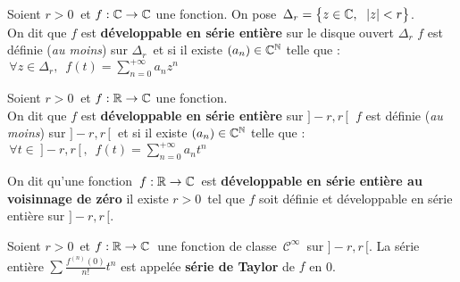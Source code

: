 \vspace{1.4cm}

Soient \(r>0\ \) et \(f:\mathbb{C} \to \mathbb{C}\) une fonction. On pose \(\,\Delta_r=\bigl\{ z\in \mathbb{C}, \ \; |z|<r \bigr\}\).\vspace{0.1cm}\\
On dit que \(f\) est \textbf{développable en série entière} sur le disque ouvert \(\Delta_r\) \ssi \(f\) est\vspace{0.1cm}\\
définie (\emph{au moins}) sur \(\Delta_r\,\) et si il existe \((a_n)\in \mathbb{C}^{\mathbb{N}}\) telle que : \(\,\displaystyle \forall z\in \Delta_r,\ \;f(t)=\sum_{n=0}^{+\infty}a_nz^n\)

\vspace{1.3cm}

Soient \(r>0\ \) et \(f:\mathbb{R} \to \mathbb{C}\) une fonction.\vspace{0.1cm}\\
On dit que \(f\) est \textbf{développable en série entière} sur \(]-\!r,r\,[\ \) \ssi \(f\) est définie (\emph{au moins}) sur \(]-\!r,r\,[\ \) et si il existe \((a_n)\in \mathbb{C}^{\mathbb{N}}\) telle que : \(\,\displaystyle \forall t\in \ ]-\!r,r\, [\, ,\ \; f(t)=\sum_{n=0}^{+\infty}a_nt^n\)

\newpage

On dit qu'une fonction \(\,f:\mathbb{R} \to \mathbb{C}\,\) est \textbf{développable en série entière au voisinnage de zéro} \ssi il existe \(r>0\,\) tel que \(f\) soit définie et développable en série entière sur \(]-\!r,r\, [\).

\vspace{1cm}

\noindent Soient \(r>0\,\) et \(f:\mathbb{R} \to \mathbb{C}\,\) une fonction de classe \(\,\mathscr{C}^\infty\,\) sur \(]-\!r,r\, [\). La série entière \(\displaystyle \sum \frac{f^{(n)}(0)}{n!}t^n\) est appelée \textbf{série de Taylor} de \(f\) en 0.

\vspace{2cm}